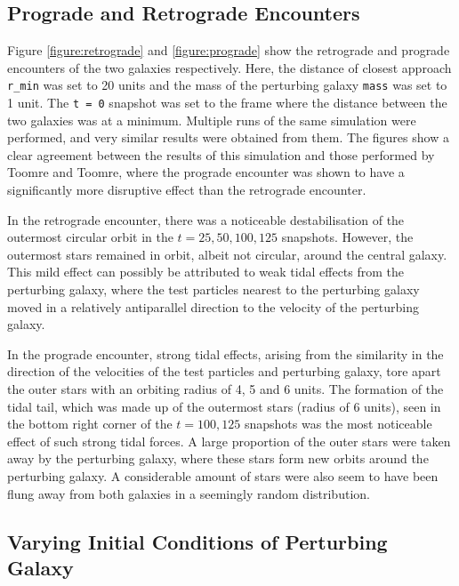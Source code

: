 \documentclass[twoside,twocolumn]{article}
\begin{document}
    \subsection{Prograde and Retrograde Encounters}

        Figure \ref{figure:retrograde} and \ref{figure:prograde} show the retrograde and prograde encounters of the two galaxies respectively. Here, the distance of closest approach \texttt{r\_min} was set to 20 units and the mass of the perturbing galaxy \texttt{mass} was set to 1 unit. The \texttt{t = 0} snapshot was set to the frame where the distance between the two galaxies was at a minimum. Multiple runs of the same simulation were performed, and very similar results were obtained from them. The figures show a clear agreement between the results of this simulation and those performed by Toomre and Toomre, where the prograde encounter was shown to have a significantly more disruptive effect than the retrograde encounter. 
        
        In the retrograde encounter, there was a noticeable destabilisation of the outermost circular orbit in the $t = 25, 50, 100, 125$ snapshots. However, the outermost stars remained in orbit, albeit not circular, around the central galaxy. This mild effect can possibly be attributed to weak tidal effects from the perturbing galaxy, where the test particles nearest to the perturbing galaxy moved in a relatively antiparallel direction to the velocity of the perturbing galaxy.
        
        In the prograde encounter, strong tidal effects, arising from the similarity in the direction of the velocities of the test particles and perturbing galaxy, tore apart the outer stars with an orbiting radius of 4, 5 and 6 units. The formation of the tidal tail, which was made up of the outermost stars (radius of 6 units), seen in the bottom right corner of the $t = 100, 125$ snapshots was the most noticeable effect of such strong tidal forces. A large proportion of the outer stars were taken away by the perturbing galaxy, where these stars form new orbits around the perturbing galaxy. A considerable amount of stars were also seem to have been flung away from both galaxies in a seemingly random distribution.

    \subsection{Varying Initial Conditions of Perturbing Galaxy}
\end{document}
